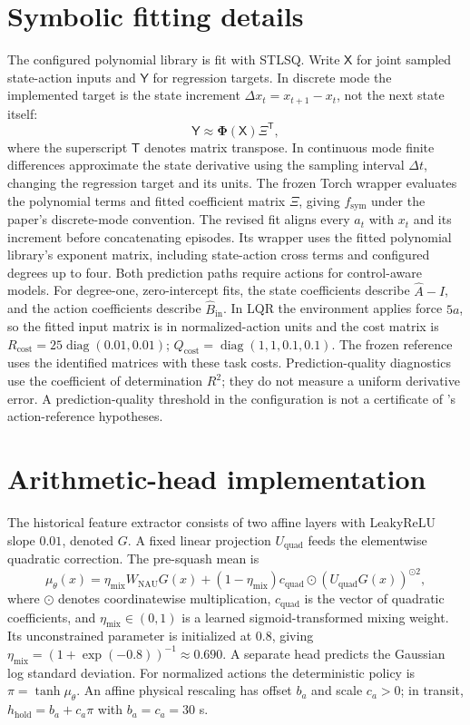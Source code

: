 \section{Symbolic fitting details}
\label{app:sindy_details}

The configured polynomial library is fit with STLSQ. Write
\(\mathsf X\) for joint sampled state-action inputs and \(\mathsf Y\) for regression targets.
In discrete mode the implemented target is the state increment
\(\Delta x_t=x_{t+1}-x_t\), not the next state itself:
\[
\mathsf Y\approx\boldsymbol\Phi(\mathsf X)\Xi^{\mathsf T},
\]
where the superscript \(\mathsf T\) denotes matrix transpose.
In continuous mode finite differences approximate the state derivative
using the sampling interval \(\Delta t\), changing the regression target
and its units. The frozen Torch wrapper evaluates
the polynomial terms and fitted coefficient matrix \(\Xi\), giving
\(f_{\mathrm{sym}}\) under the paper's discrete-mode convention.
The revised fit aligns every \(a_t\) with \(x_t\) and its increment before
concatenating episodes. Its wrapper uses the fitted polynomial library's
exponent matrix, including state-action cross terms and configured degrees
up to four. Both prediction paths require actions for control-aware models.
For degree-one, zero-intercept fits, the state coefficients describe
\(\widehat A-I\), and the action coefficients describe
\(\widehat B_{\mathrm{in}}\).
In LQR the environment applies force \(5a\), so the fitted input matrix
is in normalized-action units and the cost matrix is
\(R_{\mathrm{cost}}=25\operatorname{diag}(0.01,0.01)\);
\(Q_{\mathrm{cost}}=\operatorname{diag}(1,1,0.1,0.1)\).
The frozen reference uses the identified matrices with these task costs.
Prediction-quality diagnostics use the coefficient of determination
\(R^2\); they do not measure a uniform derivative error.
A prediction-quality threshold in the configuration is not a certificate
of 's action-reference hypotheses.

\section{Arithmetic-head implementation}
\label{app:nau_details}

The historical feature extractor consists of two affine layers with LeakyReLU slope
\(0.01\), denoted \(G\). A fixed linear projection \(U_{\mathrm{quad}}\)
feeds the elementwise quadratic correction. The pre-squash mean is
\[
\mu_\theta(x)=
\eta_{\mathrm{mix}}W_{\mathrm{NAU}}G(x)
+(1-\eta_{\mathrm{mix}})
c_{\mathrm{quad}}\odot(U_{\mathrm{quad}}G(x))^{\odot2},
\]
where \(\odot\) denotes coordinatewise multiplication,
\(c_{\mathrm{quad}}\) is the vector of quadratic coefficients, and
\(\eta_{\mathrm{mix}}\in(0,1)\) is a learned sigmoid-transformed mixing
weight. Its unconstrained parameter is initialized at \(0.8\), giving
\(\eta_{\mathrm{mix}}=(1+\exp(-0.8))^{-1}\approx0.690\).
A separate head predicts the Gaussian log standard deviation.
For normalized actions the deterministic policy is \(\pi=\tanh\mu_\theta\).
An affine physical rescaling has offset \(b_a\) and scale \(c_a>0\);
in transit, \(h_{\mathrm{hold}}=b_a+c_a\pi\) with \(b_a=c_a=30\) s.

